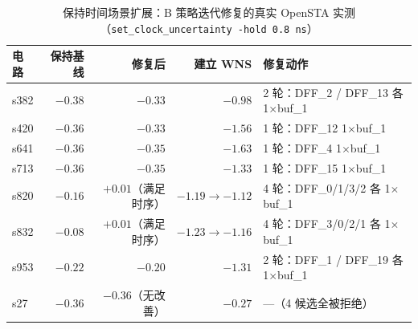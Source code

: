 \documentclass[twocolumn,10pt]{ctexart}
\begin{document}
\begin{table}[H]
\centering
\caption{保持时间场景扩展：B 策略迭代修复的真实 OpenSTA 实测（\texttt{set\_clock\_uncertainty -hold 0.8\,ns}）}
\label{tab:hold}
\scriptsize
\setlength{\tabcolsep}{1pt}
\begin{tabular}{lrrrp{1.8cm}}
\toprule
\textbf{电路} & \textbf{保持基线} & \textbf{修复后} & \textbf{建立 WNS} & \textbf{修复动作} \\
\midrule
s382 & $-0.38$ & $-0.33$ & $-0.98$ & 2 轮：DFF\_2 / DFF\_13 各 1$\times$buf\_1 \\
s420 & $-0.36$ & $-0.33$ & $-1.56$ & 1 轮：DFF\_12 1$\times$buf\_1 \\
s641 & $-0.36$ & $-0.35$ & $-1.63$ & 1 轮：DFF\_4 1$\times$buf\_1 \\
s713 & $-0.36$ & $-0.35$ & $-1.33$ & 1 轮：DFF\_15 1$\times$buf\_1 \\
s820 & $-0.16$ & $+0.01$（满足时序） & $-1.19\rightarrow -1.12$ & 4 轮：DFF\_0/1/3/2 各 1$\times$buf\_1 \\
s832 & $-0.08$ & $+0.01$（满足时序） & $-1.23\rightarrow -1.16$ & 4 轮：DFF\_3/0/2/1 各 1$\times$buf\_1 \\
s953 & $-0.22$ & $-0.20$ & $-1.31$ & 2 轮：DFF\_1 / DFF\_19 各 1$\times$buf\_1 \\
s27 & $-0.36$ & $-0.36$（无改善） & $-0.27$ & ---（4 候选全被拒绝） \\
\bottomrule
\end{tabular}
\end{table}
\end{document}
